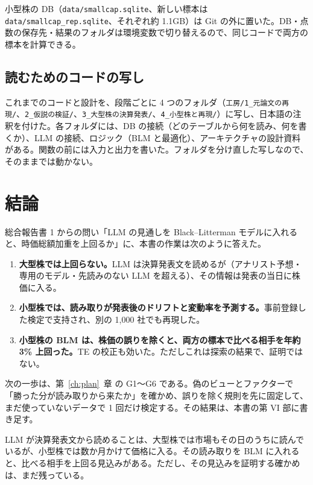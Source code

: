 \documentclass[xelatex,ja=standard,jafont=haranoaji,a4paper,10pt]{bxjsreport}
\newcommand{\code}[1]{\texttt{#1}}
\newcommand{\chapref}[1]{第~\ref{#1}~章}
\begin{document}
小型株の DB（\code{data/smallcap.sqlite}、新しい標本は \code{data/smallcap\_rep.sqlite}、それぞれ約 1.1GB）は Git の外に置いた。DB・点数の保存先・結果のフォルダは環境変数で切り替えるので、同じコードで両方の標本を計算できる。

\section{読むためのコードの写し}

これまでのコードと設計を、段階ごとに 4 つのフォルダ（\code{工房/1\_元論文の再現/}、\code{2\_仮説の検証/}、\code{3\_大型株の決算発表/}、\code{4\_小型株と再現/}）に写し、日本語の注釈を付けた。各フォルダには、DB の接続（どのテーブルから何を読み、何を書くか）、LLM の接続、ロジック（BLM と最適化）、アーキテクチャの設計資料がある。関数の前には入力と出力を書いた。フォルダを分け直した写しなので、そのままでは動かない。

\chapter{結論}\label{ch:conclusion}

総合報告書 1 からの問い「LLM の見通しを Black--Litterman モデルに入れると、時価総額加重を上回るか」に、本書の作業は次のように答えた。

\begin{enumerate}
\item \textbf{大型株では上回らない。}LLM は決算発表文を読めるが（アナリスト予想・専用のモデル・先読みのない LLM を超える）、その情報は発表の当日に株価に入る。
\item \textbf{小型株では、読み取りが発表後のドリフトと変動率を予測する。}事前登録した検定で支持され、別の 1,000 社でも再現した。
\item \textbf{小型株の BLM は、株価の誤りを除くと、両方の標本で比べる相手を年約 3\% 上回った。}TE の校正も効いた。ただしこれは探索の結果で、証明ではない。
\end{enumerate}

次の一歩は、\chapref{ch:plan} の G1〜G6 である。偽のビューとファクターで「勝った分が読み取りから来たか」を確かめ、誤りを除く規則を先に固定して、まだ使っていないデータで 1 回だけ検定する。その結果は、本書の第 VI 部に書き足す。

\begin{keybox}[一言で（10 月 25 日）]
LLM が決算発表文から読めることは、大型株では市場もその日のうちに読んでいるが、小型株では数か月かけて価格に入る。その読み取りを BLM に入れると、比べる相手を上回る見込みがある。ただし、その見込みを証明する確かめは、まだ残っている。
\end{keybox}
\end{document}
